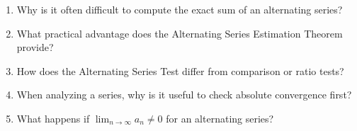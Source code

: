 \begin{enumerate}
\item Why is it often difficult to compute the exact sum of an alternating series?

\item What practical advantage does the Alternating Series Estimation Theorem provide?

\item How does the Alternating Series Test differ from comparison or ratio tests?

\item When analyzing a series, why is it useful to check absolute convergence first?

\item What happens if $\lim_{n \to \infty} a_n \neq 0$ for an alternating series?

\end{enumerate}
